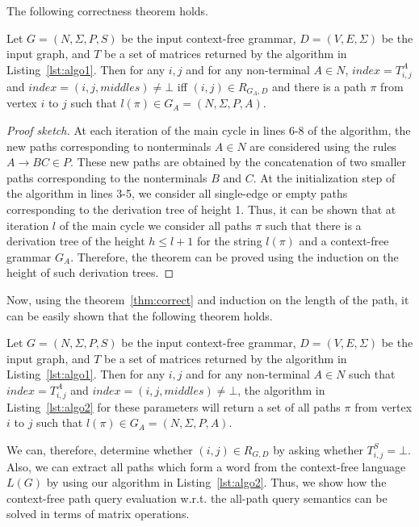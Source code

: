 The following correctness theorem holds.

\begin{mytheorem}\label{thm:correct}
Let $G = (N, \Sigma, P, S)$ be the input context-free grammar, $D = (V, E, \Sigma)$ be the input graph, and $T$ be a set of matrices returned by the algorithm in Listing~\ref{lst:algo1}. Then for any $i, j$ and for any non-terminal $A \in N$, $index = T^A_{i,j}$ and $index = (i,j,middles) \neq \bot$ iff $(i,j) \in R_{G_A, D}$ and there is a path $\pi$ from vertex $i$ to $j$ such that $l(\pi) \in G_A = (N,\Sigma,P,A)$.
\end{mytheorem}
\begin{proof}[Proof sketch]
	At each iteration of the main cycle in lines 6-8 of the algorithm, the new paths corresponding to nonterminals $A \in N$ are considered using the rules $A \to B C \in P$. These new paths are obtained by the concatenation of two smaller paths corresponding to the nonterminals $B$ and $C$. At the initialization step of the algorithm in lines 3-5, we consider all single-edge or empty paths corresponding to the derivation tree of height 1. Thus, it can be shown that at iteration $l$ of the main cycle we consider all paths $\pi$ such that there is a derivation tree of the height $h \leq l + 1$ for the string $l(\pi)$ and a context-free grammar $G_A$. Therefore, the theorem can be proved using the induction on the height of such derivation trees.	
\end{proof}

Now, using the theorem~\ref{thm:correct} and induction on the length of the path, it can be easily shown that the following theorem holds.

\begin{mytheorem}\label{thm:correct_extraction}
Let $G = (N, \Sigma, P, S)$ be the input context-free grammar, $D = (V, E, \Sigma)$ be the input graph, and $T$ be a set of matrices returned by the algorithm in Listing~\ref{lst:algo1}. Then for any $i, j$ and for any non-terminal $A \in N$ such that $index = T^A_{i,j}$ and $index = (i,j,middles) \neq \bot$, the algorithm in Listing~\ref{lst:algo2} for these parameters will return a set of all paths $\pi$ from vertex $i$ to $j$ such that $l(\pi) \in G_A = (N,\Sigma,P,A)$.
\end{mytheorem}

We can, therefore, determine whether $(i,j) \in R_{G, D}$ by asking whether $T^S_{i,j} = \bot$. Also, we can extract all paths which form a word from the context-free language $L(G)$ by using our algorithm in Listing~\ref{lst:algo2}. Thus, we show how the context-free path query evaluation w.r.t. the all-path query semantics can be solved in terms of matrix operations.

